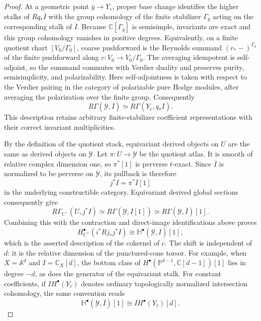 \documentclass[10pt,a4paper]{amsart}
\begin{document}
\begin{proof}
At a geometric point
$\bar y\to Y_c$, proper base change identifies the higher stalks of
$Rq_*\overline I$ with the group cohomology of the finite stabilizer
$\Gamma_{\bar y}$ acting on the corresponding stalk of $\overline I$.
Because $\mathbb C[\Gamma_{\bar y}]$ is semisimple, invariants are exact and
this group cohomology vanishes in positive degrees.  Equivalently, on a
finite quotient chart $[V_0/\Gamma_0]$, coarse pushforward is the Reynolds
summand $(r_*-)^{\Gamma_0}$ of the finite pushforward along
$r:V_0\to V_0/\Gamma_0$.  The averaging idempotent is self-adjoint, so the
summand commutes with Verdier duality and preserves purity, semisimplicity,
and polarizability.  Here self-adjointness is taken with respect to the
Verdier pairing in the category of polarizable pure Hodge modules, after
averaging the polarization over the finite group.  Consequently
\[
 R\Gamma(\mathcal Y,\overline I)
 \simeq R\Gamma(Y_c,q_*\overline I).
\]
This description retains arbitrary finite-stabilizer coefficient
representations with their correct invariant multiplicities.

By the definition of the quotient stack, equivariant derived objects on
$U$ are the same as derived objects on $\mathcal Y$.  Let
$\pi:U\to\mathcal Y$ be the quotient atlas.  It is smooth of relative
complex dimension one, so $\pi^*[1]$ is perverse $t$-exact.  Since
$\overline I$ is normalized to be perverse on $\mathcal Y$, its pullback is
therefore
\[
 j^*I=\pi^*\overline I[1]
\]
in the underlying constructible category.  Equivariant derived global
sections consequently give
\[
 R\Gamma_{\mathbb C^\times}(U,j^*I)
 \simeq R\Gamma(\mathcal Y,\overline I[1])
 \simeq R\Gamma(\mathcal Y,\overline I)[1].
\]
Combining this with the contraction and direct-image identifications above
proves
\[
 H^\bullet_{\mathbb C^\times}(i^*Rj_*j^*I)
 \cong \mathbb H^\bullet(\mathcal Y,\overline I)[1],
\]
which is the asserted description of the cokernel of $c$.  The shift is
independent of $d$: it is the relative dimension of the punctured-cone
torsor.  For
example, when $X=\mathbb A^d$ and $I=\mathbb C_X[d]$, the bottom class of
$H^\bullet(\mathbb P^{d-1},\mathbb C[d-1])[1]$ lies in degree $-d$, as does
the generator of the equivariant stalk.
For constant coefficients, if $IH^\bullet(Y_c)$ denotes ordinary
topologically normalized intersection cohomology, the same convention reads
\[
 \mathbb H^\bullet(\mathcal Y,\overline I)[1]
 \cong IH^\bullet(Y_c)[d].
\]


\end{proof}
\end{document}
